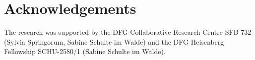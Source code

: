 \documentclass[output=paper]{langsci/langscibook}
\begin{document}
%
%
%
%


\section*{Acknowledgements}

The research was supported by the DFG Collaborative Research Centre
SFB 732 (Sylvia Springorum, Sabine Schulte im Walde) and the DFG
Heisenberg Fellowship SCHU-2580/1 (Sabine Schulte im Walde).



{\sloppy\printbibliography[heading=subbibliography,notkeyword=this]}


\newpage
\end{document}
